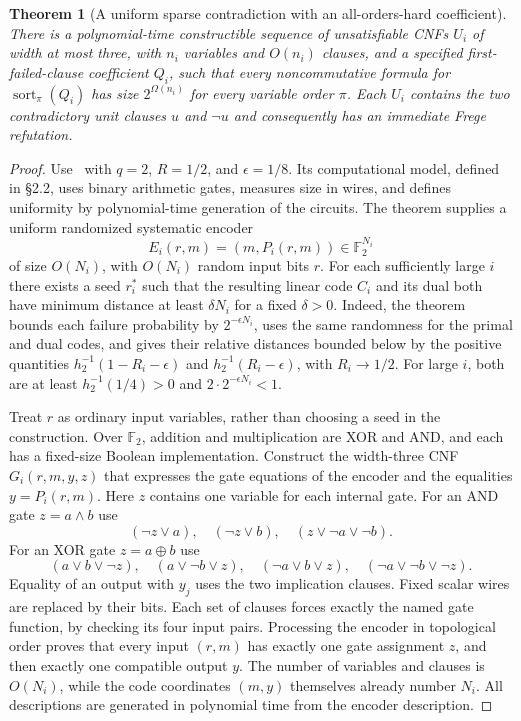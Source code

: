 \documentclass[11pt]{article}
\newtheorem{theorem}{Theorem}[section]
\theoremstyle{definition}
\theoremstyle{remark}
\begin{document}
\begin{theorem}[A uniform sparse contradiction with an all-orders-hard coefficient]
\label{thm:uniform-all-orders-coefficient}
There is a polynomial-time constructible sequence of unsatisfiable
CNFs $U_i$ of width at most three, with $n_i$ variables and $O(n_i)$
clauses, and a specified first-failed-clause coefficient $Q_i$,
such that every noncommutative formula for
$\operatorname{sort}_{\pi}(Q_i)$ has size $2^{\Omega(n_i)}$ for
every variable order $\pi$. Each $U_i$ contains the two contradictory
unit clauses $u$ and $\neg u$ and consequently has an immediate
Frege refutation.
\end{theorem}
\begin{proof}
Use~\cite[Theorem~9]{bir} with $q=2$, $R=1/2$,
and $\epsilon=1/8$. Its computational model, defined in
\S2.2, uses binary arithmetic gates, measures size in wires,
and defines uniformity by polynomial-time generation of the
circuits. The theorem supplies a uniform randomized systematic
encoder
\[
 E_i(r,m)=(m,P_i(r,m))\in\mathbb F_2^{N_i}
\]
of size $O(N_i)$, with $O(N_i)$ random input bits $r$.
For each sufficiently large $i$ there exists a seed $r_i^*$ such
that the resulting linear code $C_i$ and its dual both have
minimum distance at least $\delta N_i$ for a fixed $\delta>0$.
Indeed, the theorem bounds each failure probability by
$2^{-\epsilon N_i}$, uses the same randomness for the primal
and dual codes, and gives their relative distances bounded below
by the positive quantities
$h_2^{-1}(1-R_i-\epsilon)$ and
$h_2^{-1}(R_i-\epsilon)$, with $R_i\to1/2$.
For large $i$, both are at least $h_2^{-1}(1/4)>0$ and
$2\cdot2^{-\epsilon N_i}<1$.

Treat $r$ as ordinary input variables, rather than choosing a seed
in the construction. Over $\mathbb F_2$, addition and multiplication
are XOR and AND, and each has a fixed-size Boolean implementation.
Construct the width-three CNF $G_i(r,m,y,z)$ that expresses the
gate equations of the encoder and the equalities
$y=P_i(r,m)$. Here $z$ contains one variable for each internal
gate. For an AND gate $z=a\wedge b$ use
\[
 (\neg z\vee a),\quad(\neg z\vee b),\quad
 (z\vee\neg a\vee\neg b).
\]
For an XOR gate $z=a\oplus b$ use
\[
 (a\vee b\vee\neg z),\quad
 (a\vee\neg b\vee z),\quad
 (\neg a\vee b\vee z),\quad
 (\neg a\vee\neg b\vee\neg z).
\]
Equality of an output with $y_j$ uses the two implication clauses.
Fixed scalar wires are replaced by their bits. Each set of clauses
forces exactly the named gate function, by checking its four input
pairs. Processing the encoder in topological order proves that
every input $(r,m)$ has exactly one gate assignment $z$, and then
exactly one compatible output $y$. The number of variables and
clauses is $O(N_i)$, while the code coordinates $(m,y)$ themselves
already number $N_i$. All descriptions are generated in polynomial
time from the encoder description.


\end{proof}
\end{document}
